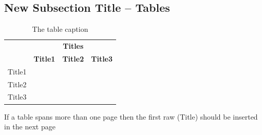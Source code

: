 \subsection{New Subsection Title – Tables}
\begin{justify}





\begin{table}[H]
\centering
\caption{The table caption}
\begin{tabular}{|p{2.25cm}|p{1.75cm}|p{1.75cm}|p{7.75cm}|} 
\hline
\rowcolor[rgb]{0.914,0.914,0.914} \multicolumn{1}{|c|}{{\cellcolor[rgb]{0.914,0.914,0.914}}}                                   & \multicolumn{3}{c|}{\textbf{Titles}}                                      \\ 
\hhline{|>{\arrayrulecolor[rgb]{0.914,0.914,0.914}}->{\arrayrulecolor{black}}---|}
\rowcolor[rgb]{0.914,0.914,0.914} \multicolumn{1}{|c|}{\multirow{-2}{*}{{\cellcolor[rgb]{0.914,0.914,0.914}}\textbf{Heading}}} & \textbf{Title1} & \textbf{Title2} & \textbf{Title3}                       \\ 
\hline
{\cellcolor[rgb]{0.914,0.914,0.914}}Title1                                                                                     &                 &                 & {\cellcolor[rgb]{0.965,0.965,0.965}}  \\ 
\hline
{\cellcolor[rgb]{0.914,0.914,0.914}}Title2                                                                                     &                 &                 &                                       \\ 
\hline
{\cellcolor[rgb]{0.914,0.914,0.914}}Title3                                                                                     &                 &                 &                                       \\
\hline
\end{tabular}
\end{table}


    If a table spans more than one page then the first raw (Title) should be inserted in the next page
    
\end{justify}

